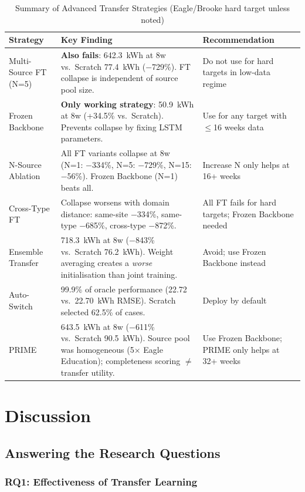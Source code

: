 \documentclass[12pt,a4paper]{report}
\begin{document}
\begin{table}[H]
\centering
\caption{Summary of Advanced Transfer Strategies (Eagle/Brooke hard target unless noted)}
\small
\begin{tabular}{p{3.0cm}p{5.5cm}p{5cm}}
\toprule
\textbf{Strategy} & \textbf{Key Finding} & \textbf{Recommendation} \\
\midrule
Multi-Source FT (N=5) & \textbf{Also fails}: 642.3~kWh at 8w vs.\ Scratch 77.4~kWh ($-$729\%). FT collapse is independent of source pool size. & Do not use for hard targets in low-data regime \\
\midrule
Frozen Backbone & \textbf{Only working strategy}: 50.9~kWh at 8w (+34.5\% vs.\ Scratch). Prevents collapse by fixing LSTM parameters. & Use for any target with $\leq$16 weeks data \\
\midrule
N-Source Ablation & All FT variants collapse at 8w (N=1: $-$334\%, N=5: $-$729\%, N=15: $-$56\%). Frozen Backbone (N=1) beats all. & Increase N only helps at 16+ weeks \\
\midrule
Cross-Type FT & Collapse worsens with domain distance: same-site $-$334\%, same-type $-$685\%, cross-type $-$872\%. & All FT fails for hard targets; Frozen Backbone needed \\
\midrule
Ensemble Transfer & 718.3~kWh at 8w ($-$843\% vs.\ Scratch 76.2~kWh). Weight averaging creates a \textit{worse} initialisation than joint training. & Avoid; use Frozen Backbone instead \\
\midrule
Auto-Switch & 99.9\% of oracle performance (22.72 vs.\ 22.70~kWh RMSE). Scratch selected 62.5\% of cases. & Deploy by default \\
\midrule
PRIME & 643.5~kWh at 8w ($-$611\% vs.\ Scratch 90.5~kWh). Source pool was homogeneous (5$\times$ Eagle Education); completeness scoring $\neq$ transfer utility. & Use Frozen Backbone; PRIME only helps at 32+ weeks \\
\bottomrule
\end{tabular}
\end{table}

\chapter{Discussion}

\section{Answering the Research Questions}

\subsection{RQ1: Effectiveness of Transfer Learning}
\end{document}
